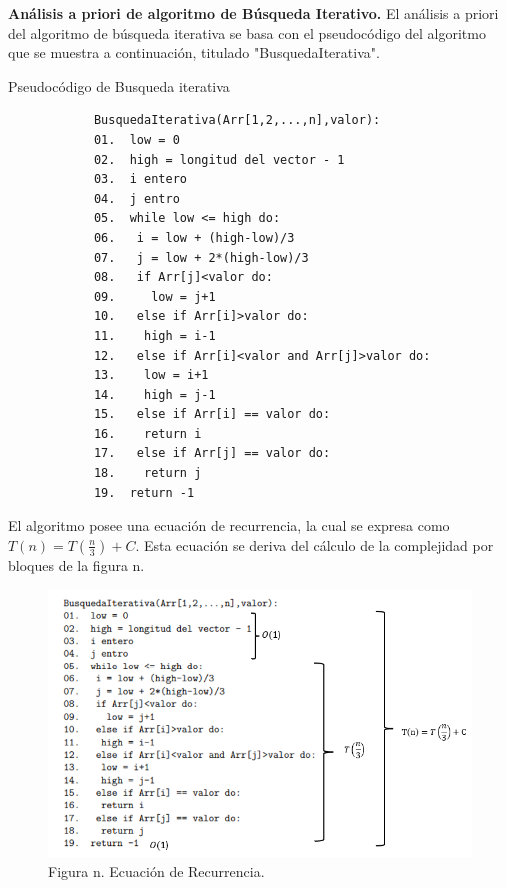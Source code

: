 \documentclass[12pt,twoside]{article}
\begin{document}
\textbf{Análisis a priori de algoritmo de Búsqueda Iterativo.} 
El análisis a priori del algoritmo de búsqueda iterativa se basa con el pseudocódigo del algoritmo que se muestra a continuación, titulado "BusquedaIterativa". 

\medskip
\begin{center}
  Pseudocódigo de Busqueda iterativa
  \begin{verbatim}
            BusquedaIterativa(Arr[1,2,...,n],valor):
            01.  low = 0
            02.  high = longitud del vector - 1
            03.  i entero 
            04.  j entro
            05.  while low <= high do:
            06.   i = low + (high-low)/3
            07.   j = low + 2*(high-low)/3
            08.   if Arr[j]<valor do:
            09.     low = j+1
            10.   else if Arr[i]>valor do:
            11.    high = i-1
            12.   else if Arr[i]<valor and Arr[j]>valor do:
            13.    low = i+1
            14.    high = j-1
            15.   else if Arr[i] == valor do:
            16.    return i
            17.   else if Arr[j] == valor do:
            18.    return j
            19.  return -1
  \end{verbatim}
  \end{center}
\newpage
El algoritmo posee una ecuación de recurrencia, la cual se expresa como $T(n) = T(\frac{n}{3})+C$. Esta ecuación se deriva del cálculo de la complejidad por bloques de la figura n.
  \begin{figure}[h]
    \begin{center}
      \includegraphics[width=0.85\linewidth]{images/apriori1.png}
      \\
      Figura n. Ecuación de Recurrencia.
    \end{center}
  \end{figure}
\end{document}
